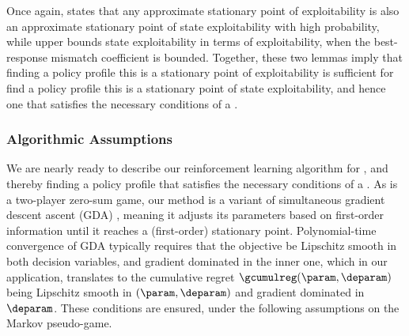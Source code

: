 
Once again,  states that any approximate stationary point of exploitability is also an approximate stationary point of state exploitability with high probability, while  upper bounds state exploitability in terms of exploitability, when the best-response mismatch coefficient is bounded.
Together, these two lemmas imply that finding a policy profile this is a stationary point of exploitability is sufficient for find a policy profile this is a stationary point of state exploitability, and hence one that satisfies the necessary conditions of a \MPGNE.


\subsubsection{Algorithmic Assumptions}

We are nearly ready to describe our  reinforcement learning algorithm for  , and thereby finding a policy profile that satisfies the necessary conditions of a \MPGNE.
As  is a two-player zero-sum game, our method is a variant of simultaneous gradient descent ascent (GDA) \cite{arrow1958studies}, meaning it adjusts its parameters based on first-order information until it reaches a (first-order) stationary point.
Polynomial-time convergence of GDA typically requires that the objective be Lipschitz smooth in both decision variables, and gradient dominated in the inner one, which in our application, translates to the cumulative regret $\gcumulreg (\param, \deparam)$ being Lipschitz smooth in $(\param, \deparam)$ and gradient dominated in $\deparam$. 
These conditions are ensured, under the following assumptions on the Markov pseudo-game.

